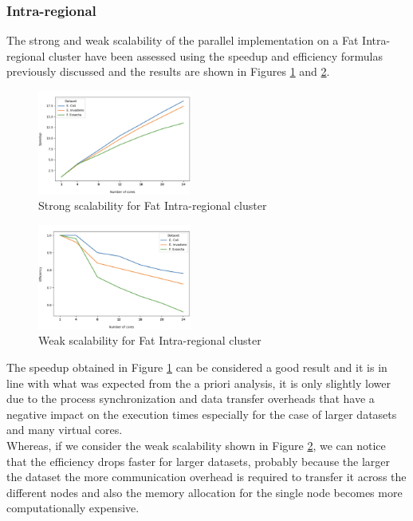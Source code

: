 \documentclass[final,5p,times,twocolumn,authoryear]{elsarticle}
\begin{document}
\subsubsection{Intra-regional}
The strong and weak scalability of the parallel implementation on a Fat Intra-regional cluster have been assessed using the speedup and efficiency formulas previously discussed and the results are shown in Figures \ref{fig:fat-intra-strong} and \ref{fig:fat-intra-weak}. \\
\begin{figure}[H]
    \centering
    \includegraphics[width=0.45\textwidth]{images/fat_intra_strong.png}
    \caption{Strong scalability for Fat Intra-regional cluster }
    \label{fig:fat-intra-strong}
\end{figure}
\begin{figure}[H]
    \centering
    \includegraphics[width=0.45\textwidth]{images/fat_intra_weak.png}
    \caption{Weak scalability for Fat Intra-regional cluster }
    \label{fig:fat-intra-weak}
\end{figure}
The speedup obtained in Figure \ref{fig:fat-intra-strong} can be considered a good result and it is in line with what was expected from the a priori analysis, it is only slightly lower due to the process synchronization and data transfer overheads that have a negative impact on the execution times especially for the case of larger datasets and many virtual cores. \\
Whereas, if we consider the weak scalability shown in Figure \ref{fig:fat-intra-weak}, we can notice that the efficiency drops faster for larger datasets, probably because the larger the dataset the more communication overhead is required to transfer it across the different nodes and also the memory allocation for the single node becomes more computationally expensive. 
\end{document}
